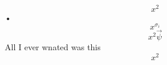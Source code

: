 \documentclass{article}
\begin{document}
\begin{equation}
x^2
\end{equation}•
\begin{equation}
	x^{\sigma_i}
\end{equation}
\begin{equation}
	x^2 \vec{\psi}
\end{equation}
All I ever wnated was this
\begin{equation}
	x^2
\end{equation}
\end{document}
